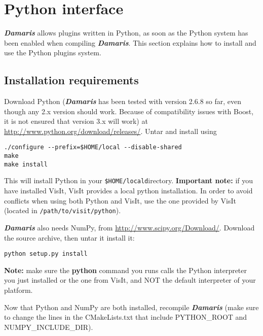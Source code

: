 \documentclass[11pt]{report}
\newcommand{\Damaris}{\emph{\textbf{Damaris}}}
\newcommand{\installdir}[1]{\texttt{\$HOME/local#1}}
\begin{document}
\chapter{Python interface}\label{Python}

\Damaris{} allows plugins written in Python, as soon as the Python system has been
enabled when compiling \Damaris{}. This section explains how to install and use the Python
plugins system.

\section{Installation requirements}

Download Python (\Damaris{} has been tested with version 2.6.8 so far, even though any 2.x version
should work. Because of compatibility issues with Boost, it is not ensured that version 3.x will work) at 
\url{http://www.python.org/download/releases/}.
Untar and install using
\begin{verbatim}
./configure --prefix=$HOME/local --disable-shared
make
make install
\end{verbatim}

This will install Python in your \installdir directory. \textbf{Important note:} if you have installed VisIt,
VisIt provides a local python installation. In order to avoid conflicts when using both Python and VisIt,
use the one provided by VisIt (located in \texttt{/path/to/visit/python}).

\Damaris{} also needs NumPy, from \url{http://www.scipy.org/Download/}. Download the source archive,
then untar it install it:

\begin{verbatim}
python setup.py install
\end{verbatim}
\textbf{Note:} make sure the \textbf{python} command you runs calls the Python interpreter you just installed
or the one from VisIt, and NOT the default interpreter of your platform.

Now that Python and NumPy are both installed, recompile \Damaris{} (make sure to change
the lines in the CMakeLists.txt that include PYTHON\_ROOT and NUMPY\_INCLUDE\_DIR).
\end{document}
